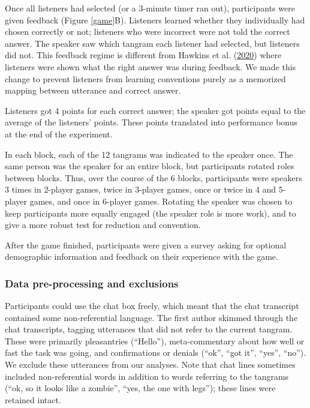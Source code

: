 \documentclass[
  english,
  a4paper,
]{article}
\begin{document}
Once all listeners had selected (or a 3-minute timer ran out), participants were given feedback (Figure \ref{game}B). Listeners learned whether they individually had chosen correctly or not; listeners who were incorrect were not told the correct answer. The speaker saw which tangram each listener had selected, but listeners did not. This feedback regime is different from Hawkins et al. (\protect\hyperlink{ref-hawkinsCharacterizingDynamicsLearning2020}{2020}) where listeners were shown what the right answer was during feedback. We made this change to prevent listeners from learning conventions purely as a memorized mapping between utterance and correct answer.

Listeners got 4 points for each correct answer; the speaker got points equal to the average of the listeners' points. These points translated into performance bonus at the end of the experiment.

In each block, each of the 12 tangrams was indicated to the speaker once. The same person was the speaker for an entire block, but participants rotated roles between blocks. Thus, over the course of the 6 blocks, participants were speakers 3 times in 2-player games, twice in 3-player games, once or twice in 4 and 5-player games, and once in 6-player games. Rotating the speaker was chosen to keep participants more equally engaged (the speaker role is more work), and to give a more robust test for reduction and convention.

After the game finished, participants were given a survey asking for optional demographic information and feedback on their experience with the game.

\hypertarget{data-pre-processing-and-exclusions}{%
\subsubsection{Data pre-processing and exclusions}\label{data-pre-processing-and-exclusions}}

Participants could use the chat box freely, which meant that the chat transcript contained some non-referential language. The first author skimmed through the chat transcripts, tagging utterances that did not refer to the current tangram. These were primarily pleasantries (``Hello''), meta-commentary about how well or fast the task was going, and confirmations or denials (``ok'', ``got it'', ``yes'', ``no''). We exclude these utterances from our analyses. Note that chat lines sometimes included non-referential words in addition to words referring to the tangrams (``ok, so it looks like a zombie'', ``yes, the one with legs''); these lines were retained intact.
\end{document}
